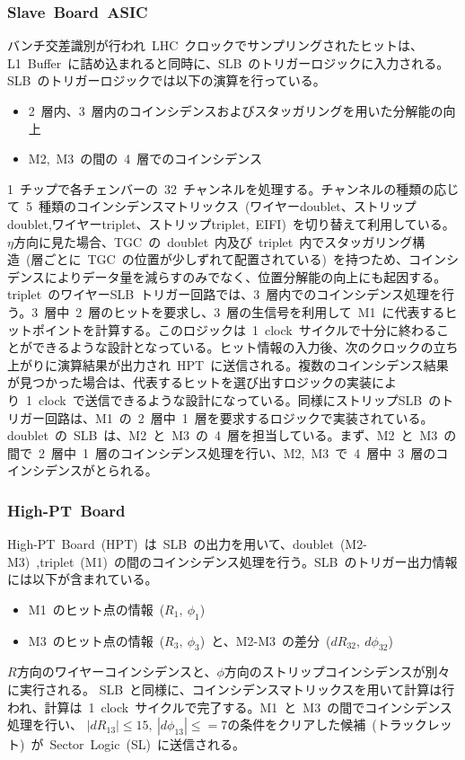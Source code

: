 \subsubsection{Slave~Board~ASIC}
バンチ交差識別が行われ~LHC~クロックでサンプリングされたヒットは、L1~Buffer~に詰め込まれると同時に、SLB~のトリガーロジックに入力される。SLB~のトリガーロジックでは以下の演算を行っている。
\begin{itemize}
\item 2~層内、3~層内のコインシデンスおよびスタッガリングを用いた分解能の向上
\item M2,~M3~の間の~4~層でのコインシデンス
\end{itemize}
1~チップで各チェンバーの~32~チャンネルを処理する。チャンネルの種類の応じて~5~種類のコインシデンスマトリックス~(ワイヤーdoublet、ストリップdoublet,ワイヤーtriplet、ストリップtriplet,~EIFI)~を切り替えて利用している。$\eta$方向に見た場合、TGC~の~doublet~内及び~triplet~内でスタッガリング構造~(層ごとに~TGC~の位置が少しずれて配置されている)~を持つため、コインシデンスによりデータ量を減らすのみでなく、位置分解能の向上にも起因する。
triplet~のワイヤーSLB~トリガー回路では、3~層内でのコインシデンス処理を行う。3~層中~2~層のヒットを要求し、3~層の生信号を利用して~M1~に代表するヒットポイントを計算する。このロジックは~1~clock~サイクルで十分に終わることができるような設計となっている。ヒット情報の入力後、次のクロックの立ち上がりに演算結果が出力され~HPT~に送信される。複数のコインシデンス結果が見つかった場合は、代表するヒットを選び出すロジックの実装により~1~clock~で送信できるような設計になっている。同様にストリップSLB~のトリガー回路は、M1~の~2~層中~1~層を要求するロジックで実装されている。
doublet~の~SLB~は、M2~と~M3~の~4~層を担当している。まず、M2~と~M3~の間で~2~層中~1~層のコインシデンス処理を行い、M2,~M3~で~4~層中~3~層のコインシデンスがとられる。

\subsubsection{High-PT~Board}
High-PT~Board~(HPT)~は~SLB~の出力を用いて、doublet~(M2-M3)~,triplet~(M1)~の間のコインシデンス処理を行う。SLB~のトリガー出力情報には以下が含まれている。
\begin{itemize}
\item M1~のヒット点の情報~($R_1,~\phi_1$)~
\item M3~のヒット点の情報~($R_3,~\phi_3$)~と、M2-M3~の差分~($dR_{32},~d\phi_{32}$)~
\end{itemize}
$R$方向のワイヤーコインシデンスと、$\phi$方向のストリップコインシデンスが別々に実行される。
SLB~と同様に、コインシデンスマトリックスを用いて計算は行われ、計算は~1~clock~サイクルで完了する。M1~と~M3~の間でコインシデンス処理を行い、
$|dR_{13}| \leq 15,~|d\phi_{13}| \leq =7$の条件をクリアした候補~(トラックレット)~が~Sector~Logic~(SL)~に送信される。
